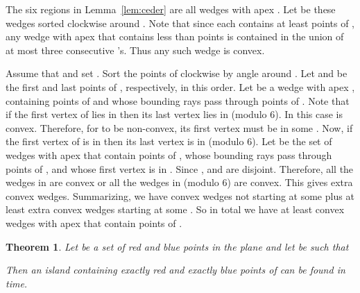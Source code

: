 \documentclass{article}
\newtheorem{theorem}{Theorem}
\def\QED{\ensuremath{{\square}}}
\def\markatright#1{\leavevmode\unskip\nobreak\quad\hspace*{\fill}{#1}}
\newenvironment{proof}
  {\begin{trivlist}\item[\hskip\labelsep{\bf Proof.}]}
  {\markatright{\QED}\end{trivlist}}
\begin{document}
\begin{proof}
The six regions in Lemma~\ref{lem:ceder} are all wedges with apex . 
Let  be these wedges sorted clockwise around . 
Note that since each  contains at least  points of , any wedge with apex  
	that contains less than  points is contained in the union of at most three consecutive 's.
Thus any such wedge is convex.

Assume that  and set . 
Sort the points of  clockwise by angle around . 
Let  and  be the first and last  points of , respectively, in this order. 
Let  be a wedge with apex , containing  points of  and whose bounding rays pass through points of . 
Note that if the first vertex of  lies in  then its last vertex lies in  (modulo 6).
In this case  is convex. 
Therefore, for  to be non-convex, its first vertex must be in some . 
Now, if the first vertex of  is in  then its last vertex is in  (modulo 6). 
Let  be the set of wedges with apex  that contain  points of , 
	whose bounding rays pass through points of , and whose first vertex is in . 
Since ,  and  are disjoint.  
Therefore, all the wedges in  are convex or all the wedges in  (modulo 6) are convex. 
This gives  extra convex wedges.
Summarizing, we have  convex wedges not starting at some  plus at least  extra convex wedges starting at some . 
So in total we have at least  convex wedges with apex  that contain  points of .
\end{proof}

\begin{theorem}\label{thm:alg_2}
Let  be a set of  red and  blue points in the plane and 
let  be such that  
	
Then an island containing exactly  red and exactly  blue points of  can be found in  time.
\end{theorem}
\end{document}
